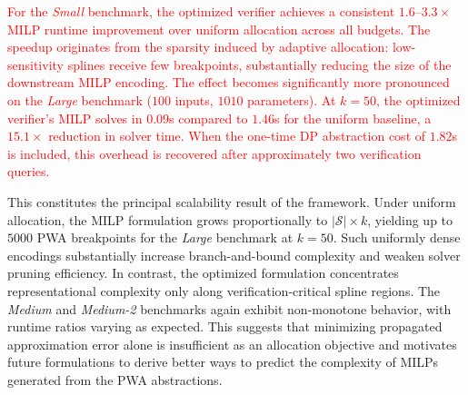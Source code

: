 \textcolor{red}{For the \emph{Small} benchmark, the optimized verifier achieves a consistent $1.6$--$3.3\times$ MILP runtime improvement over uniform allocation across all budgets. The speedup originates from the sparsity induced by adaptive allocation: low-sensitivity splines receive few breakpoints, substantially reducing the size of the downstream MILP encoding. The effect becomes significantly more pronounced on the \emph{Large} benchmark ($100$ inputs, $1010$ parameters). At $k = 50$, the optimized verifier's MILP solves in $0.09$s compared to $1.46$s for the uniform baseline, a  $15.1\times$ reduction in solver time. When the one-time DP abstraction cost of $1.82$s is included, this overhead is recovered after approximately two verification queries.}


This constitutes the principal scalability result of the framework. Under uniform allocation, the MILP formulation grows proportionally to $|\mathcal{S}| \times k$, yielding up to $5000$ PWA breakpoints for the \emph{Large} benchmark at $k=50$. Such uniformly dense encodings substantially increase branch-and-bound complexity and weaken solver pruning efficiency. In contrast, the optimized formulation concentrates representational complexity only along verification-critical spline regions.
The \emph{Medium} and \emph{Medium-2} benchmarks again exhibit non-monotone behavior, with runtime ratios varying as expected. This suggests that minimizing propagated approximation error alone is insufficient as an allocation objective and motivates future formulations to derive better ways to predict the complexity of MILPs generated from the PWA abstractions.
